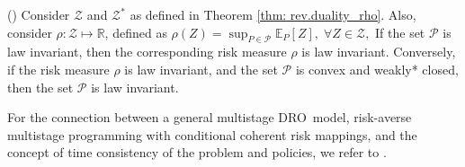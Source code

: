 \documentclass[final,onefignum,onetabnum]{class}
\newcommand{\ee}[2]{\mathbb{E}_{#1} \left[ #2 \right]}
\newcommand{\Bs}[1]{\mathbb{#1}} %
\newcommand{\Cs}[1]{\mathcal{#1}} %
\newcommand{\dro}{DRO}
\begin{document}
\begin{theorem}
	\label{thm: duality_rho_law}{(\citet[Theorem~2.3]{shapiro2017DRSP})}
	Consider $\Cs{Z}$ and $\Cs{Z}^{*}$  as defined in Theorem \ref{thm: rev.duality_rho}.  %
	Also, consider  $\rho: \Cs{Z} \mapsto \Bs{R}$, defined as 
	$\rho(Z)= \sup_{P \in \Cs{P}} \ee{P}{Z}, \; \forall Z \in \Cs{Z},$
	If the set $\Cs{P}$ is law invariant, then the corresponding risk measure $\rho$ is law invariant. Conversely, if the  risk measure $\rho$ is law invariant, and the set  $\Cs{P}$ is convex and weakly* closed, then the set $\Cs{P}$ is law invariant. 
\end{theorem}

For the connection between a general multistage \dro\ model, risk-averse multistage programming with conditional coherent risk mappings, and the concept of  time consistency of the problem and policies, we refer to \citet{shapiro2012minimax,shapiro2016rectangular,shapiro2018tutorial}. 

\begin{comment}
\subsubsection{Relationship between  RO and Coherent Risk Measures}
\label{sec: rev.ro_coherent}

In Section \ref{sec: rev.dro_ro}, we discussed how \dro\ is related to RO in a finite sample space. Thus, it is no surprise to conclude that the analogon of the relationship between \dro\ and coherent risk measures, discussed in Section \ref{sec: rev.dro_coherent}, holds for RO and coherent risk measures when the sample space is finite. More precisely, one can apply Theorem \ref{thm: rev.duality_rho} to the setting that the sample space is finite to conclude the result. On the other hand, given a coherent risk measure as a primitive,
we can construct a corresponding convex uncertainty set $\Cs{U}$ in a
RO framework \cite{bertsimas2009uncertainty}. 
A converse implication also holds; a convex uncertainty
set induces a coherent risk measure \cite{natarajan2009constructing}.
We formally present  %
this result for a specific case   in Theorem \ref{thm: duality_ro}. 

\end{comment}
\end{document}
